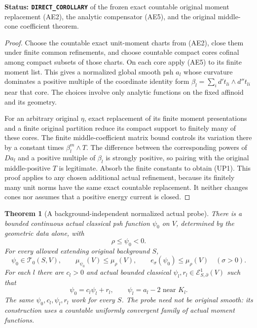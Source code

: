 \documentclass[11pt,a4paper]{article}
\numberwithin{equation}{section}
\newtheorem{theorem}{Theorem}[section]
\theoremstyle{definition}
\theoremstyle{remark}
\begin{document}
\noindent\textbf{Status: \texttt{DIRECT\_COROLLARY}} of the frozen
exact countable original moment replacement (AE2), the analytic
compensator (AE5), and the original middle-cone coefficient theorem.

\begin{proof}
Choose the countable exact unit-moment charts from (AE2), close
them under finite common refinements, and choose countable compact
cores cofinal among compact subsets of those charts.  On each core
apply (AE5) to its finite moment list.  This gives a normalized
global smooth psh $a_l$ whose curvature dominates a positive
multiple of the coordinate identity form
$\beta_l=\sum_i d't_{li}\wedge d''t_{li}$ near that core.
The choices involve only analytic functions on the fixed affinoid
and its geometry.

For an arbitrary original $\eta$, exact replacement of its finite
moment presentations and a finite original partition reduce its
compact support to finitely many of these cores.  The finite
middle-coefficient matrix bound controls its variation there by
a constant times $\beta_l^m\wedge T$.  The difference between
the corresponding powers of $Da_l$ and a positive multiple of
$\beta_l$ is strongly positive, so pairing with the original
middle-positive $T$ is legitimate.  Absorb the finite constants
to obtain (UP1).  This proof applies to any chosen additional
actual refinement, because its finitely many unit norms have the
same exact countable replacement.  It neither changes cones nor
assumes that a positive energy current is closed.
\end{proof}

\begin{theorem}[A background-independent normalized actual probe]
\label{thm:r12-geometric-finite-mass-probe}
There is a bounded continuous actual classical psh function
$\psi_0$ on $V$, determined by the geometric data alone, with
\[
                         \rho\leq\psi_0<0.
 \tag{UP2}
\]
For every allowed extending original background $S$,
\[
 \psi_0\in\mathscr T_0(S,V),\qquad
 \mu_{\psi_0}(V)\leq\mu_\rho(V),\qquad
 e_\sigma(\psi_0)\leq\mu_\rho(V)\quad(\sigma>0).
 \tag{UP3}
\]
For each $l$ there are $c_l>0$ and actual bounded classical
$\psi_l,r_l\in\mathcal E^1_{S,\partial}(V)$ such that
\[
 \psi_0=c_l\psi_l+r_l,\qquad
            \psi_l=a_l-2\text{ near }K_l.
 \tag{UP4}
\]
The same $\psi_0,c_l,\psi_l,r_l$ work for every $S$.
The probe need not be original smooth: its construction uses a
countable uniformly convergent family of actual moment functions.
\end{theorem}
\end{document}
